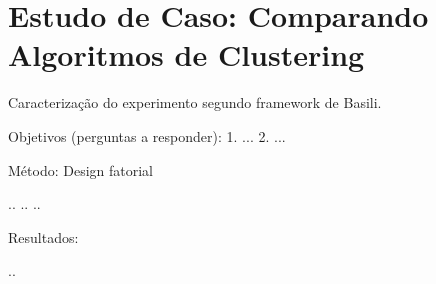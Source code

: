 
\chapter{Estudo de Caso: Comparando Algoritmos de Clustering}

Caracterização do experimento segundo framework de Basili.

Objetivos (perguntas a responder):
1. ...
2. ...

Método:
Design fatorial

..
..
..

Resultados:

..
 